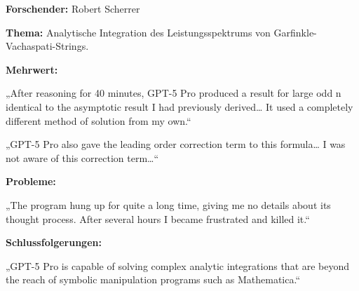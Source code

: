 \documentclass[
  ngerman,
  letterpaper,
  DIV=11]{scrreprt}
\begin{document}
\begin{tcolorbox}[enhanced jigsaw, left=2mm, bottomrule=.15mm, arc=.35mm, rightrule=.15mm, colframe=quarto-callout-note-color-frame, coltitle=black, colback=white, toprule=.15mm, toptitle=1mm, colbacktitle=quarto-callout-note-color!10!white, title=\textcolor{quarto-callout-note-color}{\faInfo}\hspace{0.5em}{Physik / Astrophysik: Gravitationsstrahlung}, opacitybacktitle=0.6, leftrule=.75mm, bottomtitle=1mm, titlerule=0mm, opacityback=0, breakable]

\textbf{Forschender:} Robert Scherrer

\textbf{Thema:} Analytische Integration des Leistungsspektrums von
Garfinkle-Vachaspati-Strings.

\textbf{Mehrwert:}

„After reasoning for 40 minutes, GPT-5 Pro produced a result for large
odd n identical to the asymptotic result I had previously
derived\ldots{} It used a completely different method of solution from
my own.``

„GPT-5 Pro also gave the leading order correction term to this
formula\ldots{} I was not aware of this correction term\ldots``

\textbf{Probleme:}

„The program hung up for quite a long time, giving me no details about
its thought process. After several hours I became frustrated and killed
it.``

\textbf{Schlussfolgerungen:}

„GPT-5 Pro is capable of solving complex analytic integrations that are
beyond the reach of symbolic manipulation programs such as
Mathematica.``

\end{tcolorbox}
\end{document}

